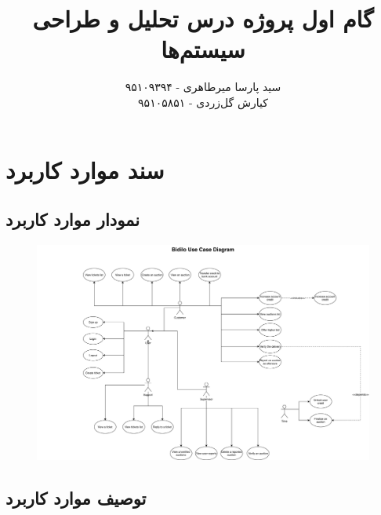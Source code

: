 \documentclass{article}
\title{\textbf{گام اول پروژه درس تحلیل و طراحی سیستم‌ها}}
\author{سید پارسا میرطاهری - ۹۵۱۰۹۳۹۴ \\ کیارش گل‌زردی - ۹۵۱۰۵۸۵۱}
\begin{document}
\date{}

\maketitle

\section{سند موارد کاربرد}

\subsection{نمودار موارد کاربرد}

\begin{figure}[htp]
\includegraphics[width = 1\textwidth]{../Use case Diagram/Use case Diagram.png}
\caption{}
\label{usecase}
\end{figure}


\subsection{توصیف موارد کاربرد}
\end{document}
